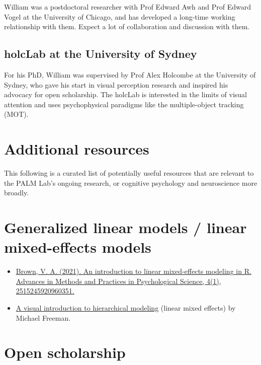 \documentclass[
]{book}
\providecommand{\tightlist}{%
  \setlength{\itemsep}{0pt}\setlength{\parskip}{0pt}}
\begin{document}
William was a postdoctoral researcher with Prof Edward Awh and Prof Edward Vogel at the University of Chicago, and has developed a long-time working relationship with them. Expect a lot of collaboration and discussion with them.

\hypertarget{holclab-at-the-university-of-sydney}{%
\subsection{holcLab at the University of Sydney}\label{holclab-at-the-university-of-sydney}}

For his PhD, William was supervised by Prof Alex Holcombe at the University of Sydney, who gave his start in visual perception research and inspired his advocacy for open scholarship. The holcLab is interested in the limits of visual attention and uses psychophysical paradigms like the multiple-object tracking (MOT).

\hypertarget{additional-resources}{%
\section{Additional resources}\label{additional-resources}}

This following is a curated list of potentially useful resources that are relevant to the PALM Lab's ongoing research, or cognitive psychology and neuroscience more broadly.

\hypertarget{generalized-linear-models-linear-mixed-effects-models}{%
\section{Generalized linear models / linear mixed-effects models}\label{generalized-linear-models-linear-mixed-effects-models}}

\begin{itemize}
\tightlist
\item
  \href{https://journals.sagepub.com/doi/full/10.1177/2515245920960351}{Brown, V. A. (2021). An introduction to linear mixed-effects modeling in R. Advances in Methods and Practices in Psychological Science, 4(1), 2515245920960351.}
\item
  \href{http://mfviz.com/hierarchical-models/}{A visual introduction to hierarchical modeling} (linear mixed effects) by Michael Freeman.
\end{itemize}

\hypertarget{open-scholarship}{%
\section{Open scholarship}\label{open-scholarship}}
\end{document}
